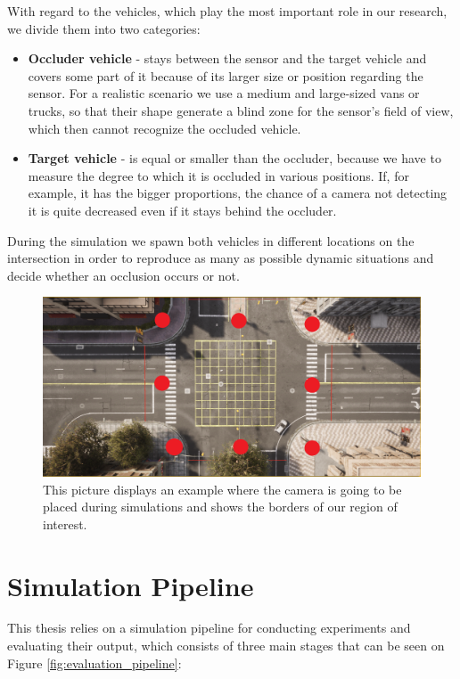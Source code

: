 With regard to the vehicles, which play the most important role in our research, we divide them into two categories:

\begin{itemize}
    \item \textbf{Occluder vehicle} - stays between the sensor and the target vehicle and covers some part of it because of its larger size or position regarding the sensor. For a realistic scenario we use a medium and large-sized vans or trucks, so that their shape generate a blind zone for the sensor's field of view, which then cannot recognize the occluded vehicle. 
    \item \textbf{Target vehicle} - is equal or smaller than the occluder, because we have to measure the degree to which it is occluded in various positions. If, for example, it has the bigger proportions, the chance of a camera not detecting it is quite decreased even if it stays behind the occluder. 
\end{itemize}
During the simulation we spawn both vehicles in different locations on the intersection in order to reproduce as many as possible dynamic situations and decide whether an occlusion occurs or not.

\begin{figure} [h]
    \centering
    \includegraphics[width=\textwidth]{images/junction.png}
    \caption[Camera experiment positions]{This picture displays an example where the camera is going to be placed during simulations and shows the borders of our region of interest.}
    \label{fig:camera_positions}
\end{figure}

\section{Simulation Pipeline} \label{sec:sim_pipeline}

This thesis relies on a simulation pipeline for conducting experiments and evaluating their output, which consists of three main stages that can be seen on Figure \ref{fig:evaluation_pipeline}: 

